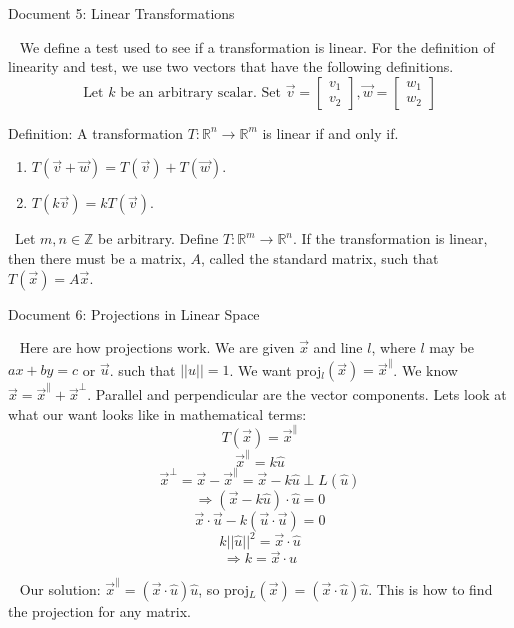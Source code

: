 \documentclass[12pt]{article}
\begin{document}
\newpage
\begin{center}
Document 5: Linear Transformations
\end{center}

\setlength{\leftskip}{0 in}
$\,\,\,$ We define a test used to see if a transformation is linear. For the definition of linearity and test, we use two vectors that have the following definitions.
$$\text{Let } k \text{ be an arbitrary scalar. Set } \vec{v}=\begin{bmatrix}v_1\\v_2\end{bmatrix},\vec{w}=\begin{bmatrix}w_1\\w_2\end{bmatrix}
$$

Definition: A transformation $T:\mathbb{R}^n\rightarrow \mathbb{R}^m$ is linear if and only if.
\begin{enumerate}
\item $T(\vec{v}+\vec{w})=T(\vec{v})+T(\vec{w})$.
\item $T(k\vec{v})=kT(\vec{v})$.\\
\end{enumerate}

$\,\,\,$Let $m,n\in\mathbb{Z}$ be arbitrary. Define $T:\mathbb{R}^m\rightarrow\mathbb{R}^n$. If the transformation is linear, then there must be a matrix, $A$, called the standard matrix, such that $T(\vec{x})=A\vec{x}$.

\newpage
\begin{center}
Document 6: Projections in Linear Space
\end{center}

\setlength{\leftskip}{0 in}
$\,\,\,$ Here are how projections work. We are given $\vec{x}$ and line $l$, where $l$ may be $ax+by=c$ or $\vec{u}$. such that $||u||=1$. We want proj$_l(\vec{x})=\vec{x}^{\parallel}$. We know $\vec{x}=\vec{x}^{\parallel}+\vec{x}^{\perp}$. Parallel and perpendicular are the vector components. Lets look at what our want looks like in mathematical terms:
$$T(\vec{x})=\vec{x}^{\parallel}$$
$$\vec{x}^{\parallel}=k\hat{u}$$
$$\vec{x}^{\perp}=\vec{x}-\vec{x}^{\parallel}=\vec{x}-k\hat{u}\perp L(\hat{u})$$
$$\Rightarrow (\vec{x}-k\hat{u})\cdot\hat{u}=0$$
$$\vec{x}\cdot\vec{u}-k(\vec{u}\cdot\vec{u})=0$$
$$k||\hat{u}||^2=\vec{x}\cdot\hat{u}$$
$$\Rightarrow k=\vec{x}\cdot\hat{u}$$

$\,\,\,$ Our solution: $\vec{x}^{\parallel}=(\vec{x}\cdot\hat{u})\hat{u}$, so proj$_L(\vec{x})=(\vec{x}\cdot\hat{u})\hat{u}$. This is how to find the projection for any matrix.
\end{document}
